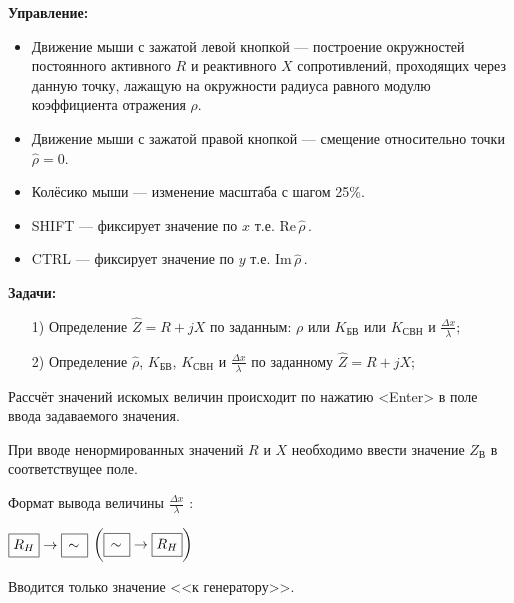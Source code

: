 \documentclass[12pt,a4paper]{article}
\begin{document}
	\begin{minipage}{0.5\textwidth}
	\textbf{Управление:}
	\begin{itemize}
		\item Движение мыши с зажатой левой кнопкой --- построение окружностей постоянного активного $R$ и
		реактивного $X$ сопротивлений, проходящих через данную точку, лажащую на окружности радиуса
		равного модулю коэффициента отражения $\rho$.
		\item Движение мыши с зажатой правой кнопкой --- смещение относительно точки $\hat{\rho} = 0$.
		\item Колёсико мыши --- изменение масштаба с шагом 25\%.
		\item SHIFT --- фиксирует значение по $x$ т.е. $\mathrm{Re}\,\hat{\rho}$\,.
		\item CTRL --- фиксирует значение по $y$ т.е. $\mathrm{Im}\,\hat{\rho}$\,.
	\end{itemize}
	\textbf{Задачи:}
	\begin{itemize}
		\item[1)] Определение $\hat{Z}=R+jX$ по заданным: $\rho$ или $K_{\text{БВ}}$ или $K_{\text{СВН}}$
		и $\displaystyle\frac{\Delta x}{\lambda}$;
		\item[2)] Определение $\hat{\rho}$, $K_{\text{БВ}}$, $K_{\text{СВН}}$
		и $\displaystyle\frac{\Delta x}{\lambda}$ по заданному $\hat{Z}=R+jX$;
	\end{itemize} 
	
	Рассчёт значений искомых величин происходит по нажатию <Enter> в поле ввода задаваемого значения.
	
	При вводе ненормированных значений $R$ и $X$ необходимо ввести значение $Z_{\text{В}}$ в соответствущее
	поле.
	
	Формат вывода величины $\displaystyle\frac{\Delta x}{\lambda}$ :
	\begin{center}
		$\boxed{R_H\mathstrut} \rightarrow \boxed{\,\sim\mathstrut}$
		$\biggl( \boxed{\,\sim\mathstrut} \rightarrow \boxed{R_H\mathstrut} \biggr)$
	\end{center}
	Вводится только значение <<к генератору>>. \\
	\end{minipage}
	\newpage
	\thispagestyle{empty}
\end{document}
